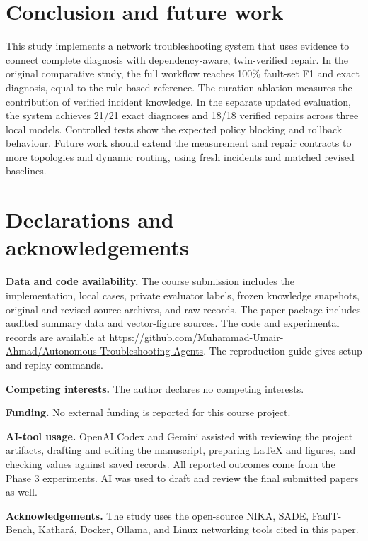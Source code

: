 \documentclass[pdflatex,sn-mathphys-num,iicol]{sn-jnl}
\begin{document}
\section{Conclusion and future work}\label{sec:conclusion}
This study implements a network troubleshooting system that uses evidence to connect complete diagnosis with dependency-aware, twin-verified repair. In the original comparative study, the full workflow reaches 100\% fault-set F1 and exact diagnosis, equal to the rule-based reference. The curation ablation measures the contribution of verified incident knowledge. In the separate updated evaluation, the system achieves 21/21 exact diagnoses and 18/18 verified repairs across three local models. Controlled tests show the expected policy blocking and rollback behaviour. Future work should extend the measurement and repair contracts to more topologies and dynamic routing, using fresh incidents and matched revised baselines.

\section{Declarations and acknowledgements}\label{sec:declarations}
\textbf{Data and code availability.} The course submission includes the implementation, local cases, private evaluator labels, frozen knowledge snapshots, original and revised source archives, and raw records. The paper package includes audited summary data and vector-figure sources. The code and experimental records are available at \url{https://github.com/Muhammad-Umair-Ahmad/Autonomous-Troubleshooting-Agents}. The reproduction guide gives setup and replay commands.

\textbf{Competing interests.} The author declares no competing interests.

\textbf{Funding.} No external funding is reported for this course project.

\textbf{AI-tool usage.} OpenAI Codex and Gemini assisted with reviewing the project artifacts, drafting and editing the manuscript, preparing LaTeX and figures, and checking values against saved records. All reported outcomes come from the Phase 3 experiments. AI was used to draft and review the final submitted papers as well.

\textbf{Acknowledgements.} The study uses the open-source NIKA, SADE, FaulT-Bench, Kathar\'{a}, Docker, Ollama, and Linux networking tools cited in this paper.


\end{document}
